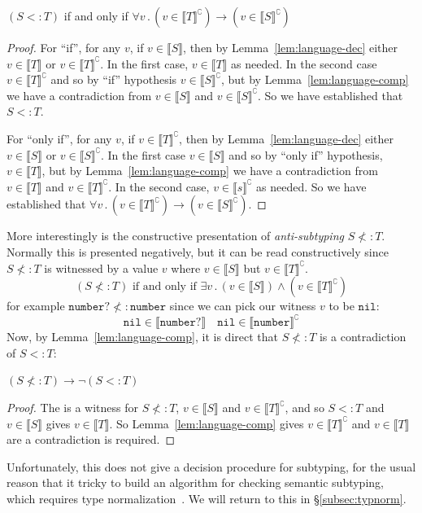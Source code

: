 \documentclass[acmsmall,review,screen]{acmart}
\newcommand{\NIL}{\mathtt{nil}}
\newcommand{\NUMBER}{\mathtt{number}}
\newcommand{\fun}{\mathbin{\rightarrow}}
\newcommand{\sem}[1]{\llbracket{#1}\rrbracket}
\newcommand{\nsem}[1]{\llbracket{#1}\rrbracket^\complement}
\newcommand{\st}{\mathbin.}
\begin{document}
\begin{lemma}
  \label{lem:nsubtyp}
  $(S <: T)$ if and only if $\forall v \st (v \in \nsem{T}) \fun (v \in \nsem{S})$
\end{lemma}
\begin{proof}
  For ``if'', for any $v$, if $v \in \sem{S}$, then by Lemma~\ref{lem:language-dec}
  either $v \in \sem{T}$ or $v \in \nsem{T}$. In the first case, $v \in \sem{T}$ as needed.
  In the second case $v \in \nsem{T}$ and so by ``if'' hypothesis $v \in \nsem{S}$,
  but by Lemma~\ref{lem:language-comp} we have a contradiction from $v \in \sem{S}$ and $v \in \nsem{S}$.
  So we have established that $S <: T$.

  For ``only if'', for any $v$, if $v \in \nsem{T}$, then by Lemma~\ref{lem:language-dec}
  either $v \in \sem{S}$ or $v \in \nsem{S}$. 
  In the first case $v \in \sem{S}$ and so by ``only if'' hypothesis, $v \in \sem{T}$,
  but by Lemma~\ref{lem:language-comp} we have a contradiction from $v \in \sem{T}$ and $v \in \nsem{T}$.
  In the second case, $v \in \nsem{s}$ as needed.
  So we have established that $\forall v \st (v \in \nsem{T}) \fun (v \in \nsem{S})$.
\end{proof}
  
More interestingly is the constructive presentation of \emph{anti-subtyping} $S \not<: T$. Normally this is
presented negatively, but it can be read constructively since $S \not<: T$ is witnessed by
a value $v$ where $v \in \sem{S}$ but $v \in \nsem{T}$.
\[
  (S \not<: T) \mbox{ if and only if } \exists v \st (v \in \sem{S}) \land (v \in \nsem{T})
\]
for example $\NUMBER? \not<: \NUMBER$ since we can pick our witness $v$ to be $\NIL$:
\[
  \NIL \in \sem{\NUMBER?}
  \quad
  \NIL \in \nsem{\NUMBER}
\]
Now, by Lemma~\ref{lem:language-comp}, it is direct that $S \not<: T$ is a contradiction of $S <: T$:

\begin{lemma}
  $(S \not<: T) \fun \neg(S <: T)$
\end{lemma}
\begin{proof}
  The is a witness for $S \not<: T$, $v\in\sem{S}$ and $v\in\nsem{T}$,
  and so $S <: T$ and $v\in\sem{S}$ gives $v\in\sem{T}$.
  So Lemma~\ref{lem:language-comp} gives $v\in\nsem{T}$ and $v\in\sem{T}$
  are a contradiction is required.
\end{proof}
  
Unfortunately, this does not give a decision procedure for
subtyping, for the usual reason that it tricky to build an algorithm for
checking semantic subtyping, which requires type normalization~\cite{???}.
We will return to this in \S\ref{subsec:typnorm}.
\end{document}
